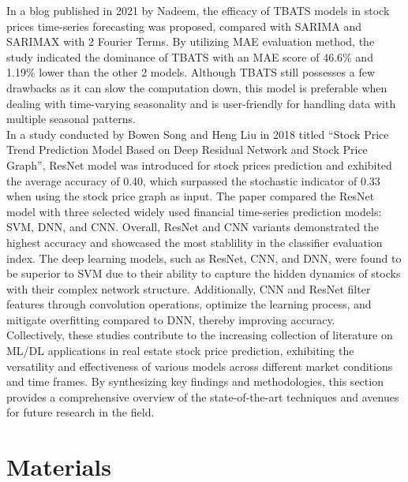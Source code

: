 \documentclass[conference]{IEEEtran}
\begin{document}
In a blog published in 2021 by Nadeem, the efficacy of TBATS models in stock prices time-series forecasting was proposed, compared with SARIMA and SARIMAX with 2 Fourier Terms. By utilizing MAE evaluation method, the study indicated the dominance of TBATS with an MAE score of 46.6\% and 1.19\% lower than the other 2 models. Although TBATS still possesses a few drawbacks as it can slow the computation down, this model is preferable when dealing with time-varying seasonality and is user-friendly for handling data with multiple seasonal patterns.\\
In a study conducted by Bowen Song and Heng Liu in 2018 titled “Stock Price Trend Prediction Model Based on Deep Residual Network and Stock Price Graph”, ResNet model was introduced for stock prices prediction and exhibited the average accuracy of 0.40, which surpassed the stochastic indicator of 0.33 when using the stock price graph as input. The paper compared the ResNet model with three selected widely used financial time-series prediction models: SVM, DNN, and CNN. Overall, ResNet and CNN variants demonstrated the highest accuracy and showcased the most stablility in the classifier evaluation index. The deep learning models, such as ResNet, CNN, and DNN, were found to be superior to SVM due to their ability to capture the hidden dynamics of stocks with their complex network structure. Additionally, CNN and ResNet filter features through convolution operations, optimize the learning process, and mitigate overfitting compared to DNN, thereby improving accuracy.\\
Collectively, these studies contribute to the increasing collection of literature on ML/DL applications in real estate stock price prediction, exhibiting the versatility and effectiveness of various models across different market conditions and time frames. By synthesizing key findings and methodologies, this section provides a comprehensive overview of the state-of-the-art techniques and avenues for future research in the field.

\section{\textbf{Materials}}
\end{document}
